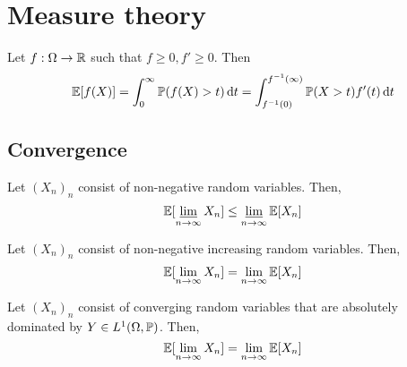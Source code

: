 \section{Measure theory}

\begin{thm}
    Let \(f: \Omega \to \mathbb{R}\) such that $f\geq 0, f'\geq 0$. Then 
    \[\mathbb{E}[f(X)] = \int_0^\infty \mathbb{P}(f(X)>t) \dd{t} = \int_{f^{-1}(0)}^{f^{-1}(\infty)} \mathbb{P}(X>t)f'(t) \dd{t}\]
  \end{thm}


\subsection{Convergence}

\begin{thm}
  Let $(X_n)_n$ consist of non-negative random variables. Then, \[\mathbb{E}[\varliminf_{n\to\infty}X_n] \leq \varliminf_{n\to\infty}\mathbb{E}[X_n]\] 
\end{thm}

\begin{thm}
    Let $(X_n)_n$ consist of non-negative increasing random variables. Then,
    \[\mathbb{E}[\lim_{n\to\infty} X_n] = \lim_{n\to\infty}\mathbb{E}[X_n]\]
\end{thm}

\begin{thm}
    Let $(X_n)_n$ consist of converging random variables that are absolutely dominated by $Y\in L^1( \Omega, \mathbb{P})$. Then,
    \[\mathbb{E}[\lim_{n\to\infty} X_n] = \lim_{n\to \infty} \mathbb{E}[X_n]\]
\end{thm}


